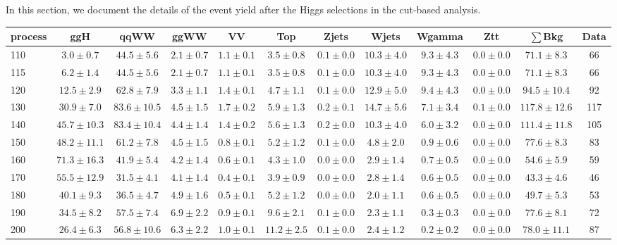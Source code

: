 In this section, we document the details of the event yield after the Higgs 
selections in the cut-based analysis. 

\begin{table}
{%
 \tiny
 \begin{center}
 \begin{tabular}{l c c c c c c c c c c c }
 \hline
 process & ggH & qqWW & ggWW & VV & Top & Zjets & Wjets & Wgamma & Ztt & $\sum$Bkg & Data \\
 \hline
110 & $3.0\pm0.7$ & $44.5\pm5.6$ & $2.1\pm0.7$ & $1.1\pm0.1$ & $3.5\pm0.8$ & $0.1\pm0.0$ & $10.3\pm4.0$ & $9.3\pm4.3$ & $0.0\pm0.0$ & $71.1\pm8.3$ & 66 \\
115 & $6.2\pm1.4$ & $44.5\pm5.6$ & $2.1\pm0.7$ & $1.1\pm0.1$ & $3.5\pm0.8$ & $0.1\pm0.0$ & $10.3\pm4.0$ & $9.3\pm4.3$ & $0.0\pm0.0$ & $71.1\pm8.3$ & 66 \\
120 & $12.5\pm2.9$ & $62.8\pm7.9$ & $3.3\pm1.1$ & $1.4\pm0.1$ & $4.7\pm1.1$ & $0.1\pm0.0$ & $12.9\pm5.0$ & $9.4\pm4.3$ & $0.0\pm0.0$ & $94.5\pm10.4$ & 92 \\
130 & $30.9\pm7.0$ & $83.6\pm10.5$ & $4.5\pm1.5$ & $1.7\pm0.2$ & $5.9\pm1.3$ & $0.2\pm0.1$ & $14.7\pm5.6$ & $7.1\pm3.4$ & $0.1\pm0.0$ & $117.8\pm12.6$ & 117 \\
140 & $45.7\pm10.3$ & $83.4\pm10.4$ & $4.4\pm1.4$ & $1.4\pm0.2$ & $5.6\pm1.3$ & $0.2\pm0.0$ & $10.3\pm4.0$ & $6.0\pm3.2$ & $0.0\pm0.0$ & $111.4\pm11.8$ & 105 \\
150 & $48.2\pm11.1$ & $61.2\pm7.8$ & $4.5\pm1.5$ & $0.8\pm0.1$ & $5.2\pm1.2$ & $0.1\pm0.0$ & $4.8\pm2.0$ & $0.9\pm0.6$ & $0.0\pm0.0$ & $77.6\pm8.3$ & 83 \\
160 & $71.3\pm16.3$ & $41.9\pm5.4$ & $4.2\pm1.4$ & $0.6\pm0.1$ & $4.3\pm1.0$ & $0.0\pm0.0$ & $2.9\pm1.4$ & $0.7\pm0.5$ & $0.0\pm0.0$ & $54.6\pm5.9$ & 59 \\
170 & $55.5\pm12.9$ & $31.5\pm4.1$ & $4.1\pm1.4$ & $0.4\pm0.1$ & $3.9\pm0.9$ & $0.0\pm0.0$ & $2.8\pm1.4$ & $0.6\pm0.5$ & $0.0\pm0.0$ & $43.3\pm4.6$ & 46 \\
180 & $40.1\pm9.3$ & $36.5\pm4.7$ & $4.9\pm1.6$ & $0.5\pm0.1$ & $5.2\pm1.2$ & $0.0\pm0.0$ & $2.0\pm1.1$ & $0.6\pm0.5$ & $0.0\pm0.0$ & $49.7\pm5.3$ & 53 \\
190 & $34.5\pm8.2$ & $57.5\pm7.4$ & $6.9\pm2.2$ & $0.9\pm0.1$ & $9.6\pm2.1$ & $0.1\pm0.0$ & $2.3\pm1.1$ & $0.3\pm0.3$ & $0.0\pm0.0$ & $77.6\pm8.1$ & 72 \\
200 & $26.4\pm6.3$ & $56.8\pm10.6$ & $6.3\pm2.2$ & $1.0\pm0.1$ & $11.2\pm2.5$ & $0.1\pm0.0$ & $2.4\pm1.2$ & $0.2\pm0.2$ & $0.0\pm0.0$ & $78.0\pm11.1$ & 87 \\

\end{tabular}
\end{center}}
\end{table}
